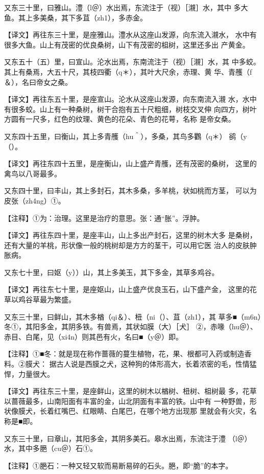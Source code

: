 \documentclass[a4paper,12pt,UTF8,twoside]{ctexbook}
\begin{document}
又东三十里，曰雅山。澧（l＠）水出焉，东流注于（视）［瀙］水，其中 多大鱼。其上多美桑，其下多苴（zh1），多赤金。

【译文】再往东三十里，是座雅山。澧水从这座山发源，向东流入瀙水， 水中有很多大鱼。山上有茂密的优良桑树，山下有茂密的柤树，这里还多出 产黄金。

又东五十（五）里，曰宣山。沦水出焉，东南流注于（视）［瀙］水，其 中多蛟。其上有桑焉，大五十尺，其枝四衢（q＊），其叶大尺余，赤理、黄 华、青雘（f＆），名曰帝女之桑。

【译文】再往东五十里，是座宣山。沦水从这座山发源，向东南流入瀙 水，水中有很多蛟。山上有一种桑树，树干合抱有五十尺粗细，树枝交叉伸 向四方，树叶方圆有一尺多，红色的纹理、黄色的花朵、青色的花萼，名称 是帝女桑。

又东四十五里，曰衡山，其上多青雘（hu＾），多桑，其鸟多鸜（q＊） 鹆（y（）。

【译文】再往东四十五里，是座衡山，山上盛产青雘，还有茂密的桑树， 这里的禽鸟以八哥最多。

又东四十里，曰丰山，其上多封石，其木多桑，多羊桃，状如桃而方茎， 可以为皮张（zh4ng）①。

【注释】①为：治理。这里是治疗的意思。张：通“胀”。浮肿。

【译文】再往东四十里，是座丰山，山上多出产封石，这里的树木大多 是桑树，还有大量的羊桃，形状像一般的桃树却是方方的茎干，可以用它医 治人的皮肤肿胀病。

又东七十里，曰妪（y））山，其上多美玉，其下多金，其草多鸡谷。

【译文】再往东七十里，是座妪山，山上盛产优良玉石，山下盛产金， 这里的花草以鸡谷草最为繁盛。

又东三十里，曰鲜山，其木多楢（qi＆）、杻（ni（）、苴（zh1），其 草多■（m6n）冬①，其阳多金，其阴多铁。有兽焉，其状如膜（大）［犬］ ②，赤喙（hu＠）、赤目、白尾，见（xi4n）则其邑有火，名曰■（y＠）即。

【注释】①■冬：就是现在称作蔷薇的蔓生植物，花，果、根都可入药或制造香料。②膜犬： 据古人说是西膜之犬，这种狗的体形高大，长着浓密的毛，性情猛悍，力量很大。

【译文】再往东三十里，是座鲜山，这里的树木以楢树、杻树、柤树最 多，花草以蔷薇最多，山南阳面有丰富的金，山北阴面有丰富的铁。山中有 一种野兽，形状像膜犬，长着红嘴巴、红眼睛、白尾巴，在哪个地方出现那 里就会有火灾，名称是■即。

又东三十里，曰章山，其阳多金，其阴多美石。皋水出焉，东流注于澧 （l＠）水，其中多脃（cu＠）石①。

【注释】①脃石：一种又轻又软而易断易碎的石头。脃，即“脆”的本字。
\end{document}
